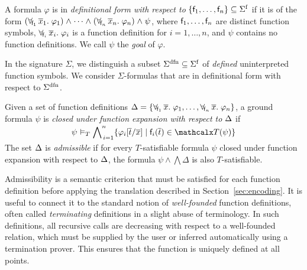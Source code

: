 \begin{definition}\rm
A formula $\varphi$ is in \emph{definitional form with respect to}
$\{ \con{f}_1, \ldots, \con{f}_n \} \subseteq \sfuns{\Sigma}$ if it is of the
form
%
%
$(\forallf{\con{f}_1} \vec x_1.\; \varphi_1) \wedge \cdots \wedge
(\forallf{\con{f}_n} \vec x_n.\; \varphi_n) \wedge \psi$,
%
where $\mathsf{f}_1, \ldots, \mathsf{f}_n$ are distinct function symbols,
$\forall_{\!\mathsf{f}_i\:} \overline{x}_i.\; \varphi_i$ is a function definition
for $i = 1, \ldots, n$,
%
and $\psi$ contains no function definitions.
We call $\psi$ the \emph{goal} of $\varphi$.
\end{definition}

In the signature $\Sigma$, we distinguish a subset $\sfundefs{\Sigma}
\subseteq \sfuns{\Sigma}$ of \emph{defined} uninterpreted function symbols.
We consider $\Sigma$-formulas that are in definitional form with respect to
$\sfundefs{\Sigma}$.

\begin{definition}\rm
Given a set of function definitions
$\DDD = \{ \forallf{\con{f}_1} \vec x.\; \varphi_1, \ldots, \forallf{\con{f}_n} \vec x.\; \varphi_n \}$,
a ground formula $\psi$
is \emph{closed under function expansion with respect to $\DDD$} if
\[\psi \models_T \smash{\bigwedge\nolimits_{\,i=1}^{n} \{ \varphi_i[ \vec t / \vec x ] \mid \con{f}_i( \vec t ) \in \terms( \psi ) \}}\]
The set $\DDD$ is \emph{admissible} if for every $T$-satisfiable formula
$\psi$ closed under function expansion with respect to $\DDD$,
the formula
$\psi \wedge \bigwedge \Delta$ is also $T$-satisfiable.
\end{definition}

Admissibility is a semantic criterion that must be satisfied for each function
definition before applying the translation described in
Section~\ref{sec:encoding}. It is useful to connect it to the
standard notion of \emph{well-founded} function definitions, often called
\emph{terminating} definitions in a slight abuse of terminology. In such
definitions, all recursive calls are decreasing with respect to a well-founded
relation, which must be supplied by the user or inferred automatically
using a termination prover. This ensures that the function is uniquely defined
at all points.

